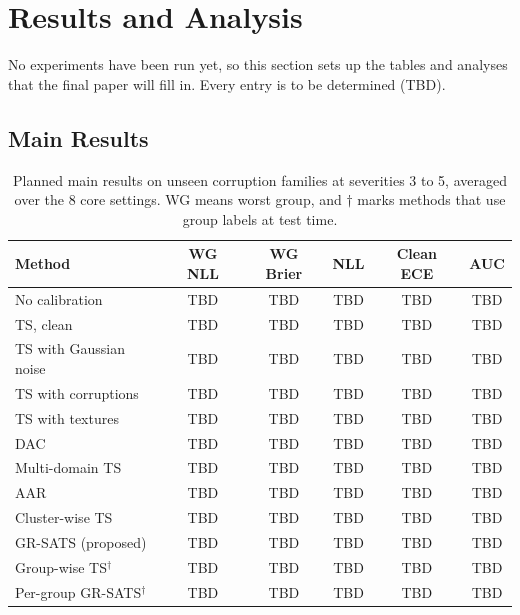 \documentclass[sigconf,nonacm]{acmart}
\begin{document}
\section{Results and Analysis}
\label{sec:results}

No experiments have been run yet, so this section sets up the tables and analyses that the final paper will fill in. Every entry is to be determined (TBD).

\subsection{Main Results}

\begin{table}[t]
  \caption{Planned main results on unseen corruption families at severities 3 to 5, averaged over the 8 core settings. WG means worst group, and $\dagger$ marks methods that use group labels at test time.}
  \label{tab:results}
  \scriptsize
  \setlength{\tabcolsep}{3.5pt}
  \begin{tabular}{@{}lccccc@{}}
    \toprule
    \textbf{Method} & \textbf{WG NLL} & \textbf{WG Brier} & \textbf{NLL} & \textbf{Clean ECE} & \textbf{AUC} \\
    \midrule
    No calibration & TBD & TBD & TBD & TBD & TBD \\
    TS, clean & TBD & TBD & TBD & TBD & TBD \\
    TS with Gaussian noise & TBD & TBD & TBD & TBD & TBD \\
    TS with corruptions & TBD & TBD & TBD & TBD & TBD \\
    TS with textures & TBD & TBD & TBD & TBD & TBD \\
    DAC & TBD & TBD & TBD & TBD & TBD \\
    Multi-domain TS & TBD & TBD & TBD & TBD & TBD \\
    AAR & TBD & TBD & TBD & TBD & TBD \\
    Cluster-wise TS & TBD & TBD & TBD & TBD & TBD \\
    GR-SATS (proposed) & TBD & TBD & TBD & TBD & TBD \\
    \midrule
    Group-wise TS$^\dagger$ & TBD & TBD & TBD & TBD & TBD \\
    Per-group GR-SATS$^\dagger$ & TBD & TBD & TBD & TBD & TBD \\
    \bottomrule
  \end{tabular}
\end{table}
\end{document}
